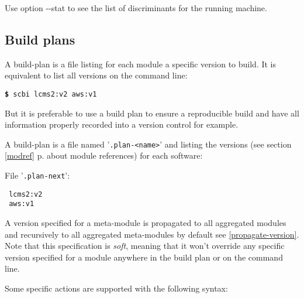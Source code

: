\documentclass[a4paper,12pt,twoside]{article}
\renewcommand{\emph}[1]{\textit{#1}}
\newcommand{\seeref}[1]{see section \ref{#1} p.\pageref{#1}}
\newcommand{\file}[1]{'{\texttt{#1}}'}
\newcommand{\cmd}[1]{\tabto{1cm}\hspace{0.5cm}\texttt{\textbf{\$} #1}}
\newcommand{\ddash}{-{}-}
\begin{document}
Use option \ddash{}stat to see the list of discriminants for the running machine.

\subsection{Build plans}
\label{build-plan}

A build-plan is a file listing for each module a specific version to build. It is equivalent to list all versions on the command line:

\cmd{scbi lcms2:v2 aws:v1}

But it is preferable to use a build plan to ensure a reproducible build and have all information properly recorded into a version control for example.

A build-plan is a file named \file{.plan-<name>} and listing the versions (\seeref{modref} about module references) for each software:

File \file{.plan-next}:
\begin{lstlisting}
 lcms2:v2
 aws:v1
\end{lstlisting}

A version specified for a meta-module is propagated to all aggregated modules and recursively to all aggregated meta-modules by default see \ref{propagate-version}. Note that this specification is \emph{soft}, meaning that it won't override any specific version specified for a module anywhere in the build plan or on the command line.

Some specific actions are supported with the following syntax:
\end{document}

